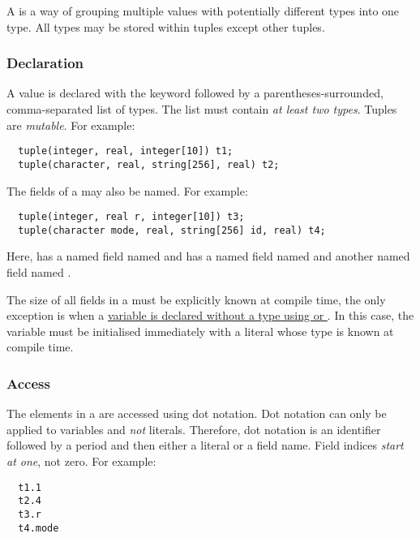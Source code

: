 \documentclass[types.tex]{subfiles}
\begin{document}
A  is a way of grouping multiple values with potentially different types into one type.
All types may be stored within tuples except other tuples.

\subsubsection{Declaration}
\label{sssec:tuple_decl}
A  value is declared with the keyword  followed by a parentheses-surrounded,
comma-separated list of types. The list must contain \textit{at least two types}. Tuples are
\textit{mutable}. For example:
\begin{lstlisting}
  tuple(integer, real, integer[10]) t1;
  tuple(character, real, string[256], real) t2;
\end{lstlisting}


The fields of a  may also be named. For example:
\begin{lstlisting}
  tuple(integer, real r, integer[10]) t3;
  tuple(character mode, real, string[256] id, real) t4;
\end{lstlisting}

Here,  has a named  field named  and  has a named
 field named  and another named  field named .

The size of all fields in a  must be explicitly known at compile time, the only
exception is when a \hyperref[sec:typeQualifiers]{variable is declared without a type using
 or }. In this case, the variable must be initialised immediately with a
literal whose type is known at compile time.


\subsubsection{Access}
\label{sssec:tuple_acc}
The elements in a  are accessed using dot notation. Dot notation can only be applied to
 variables and \textit{not}  literals. Therefore, dot notation is an
identifier followed by a period and then either a literal  or a field name. Field
indices \textit{start at one}, not zero. For example:
\begin{lstlisting}
  t1.1
  t2.4
  t3.r
  t4.mode
\end{lstlisting}
\end{document}
